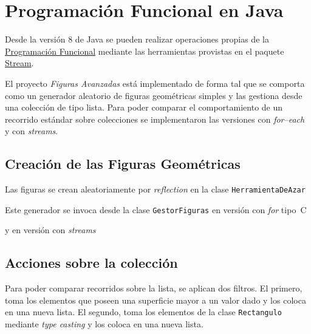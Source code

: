 \section*{Programación Funcional en Java}

Desde la versión 8 de Java se pueden realizar operaciones propias de
la \href{https://www.oracle.com/technical-resources/articles/java/architect-lambdas-part1.html}{Programación Funcional}
mediante las herramientas provistas en el paquete
\href{https://docs.oracle.com/en/java/javase/17/docs/api/java.base/java/util/stream/package-use.html}{Stream}.

El proyecto \emph{Figuras Avanzadas} está implementado de forma
tal que se comporta como un generador aleatorio de figuras
geométricas simples y las gestiona desde una colección de tipo
lista.  Para poder comparar el comportamiento de un recorrido
estándar sobre colecciones se implementaron las versiones con
\emph{for--each} y con \emph{streams}.

\subsection*{Creación de las Figuras Geométricas}

Las figuras se crean aleatoriamente por \emph{reflection} en la clase \verb|HerramientaDeAzar|



Este generador se invoca desde la clase \verb|GestorFiguras| en
versión con \emph{for} tipo~C



y en versión con \emph{streams}




\subsection*{Acciones sobre la colección}

Para poder comparar recorridos sobre la lista, se aplican dos filtros.
El primero, toma los elementos que poseen una superficie mayor a un valor
dado y los coloca en una nueva lista.  El segundo, toma los elementos
de la clase \verb|Rectangulo| mediante \emph{type casting} y los coloca
en una nueva lista.

